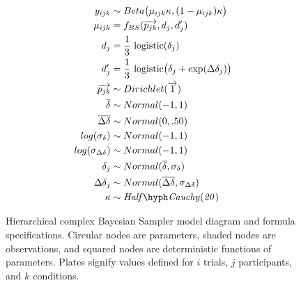 \begin{figure}
\begin{minipage}{.5\textwidth}
\begin{tikzpicture}
\end{tikzpicture}
  \end{minipage}%
  \begin{minipage}{.5\textwidth}
    \flushleft
    \small
    \begin{align*}
  y_{ijk} &\sim Beta\big(\mu_{ijk} \kappa, (1-\mu_{ijk}) \kappa \big) \\
  \mu_{ijk} &= f_{BS}(\overrightarrow{p_{jk}}, d_j, d_j')  \\
  d_j &= \frac{1}{3} \ \text{logistic}(\delta_j) \\
  d_j' &= \frac{1}{3} \ \text{logistic}\big(\delta_j + \exp(\Delta\delta_j)\big) \\
  \overrightarrow{p_{jk}} &\sim Dirichlet(\overrightarrow{1}) \\
  \overline{\delta} &\sim Normal(-1, 1) \\
  \overline{\Delta\delta} &\sim Normal(0, .50) \\
  log(\sigma_{\delta}) &\sim Normal(-1, 1) \\
  log(\sigma_{\Delta\delta}) &\sim Normal(-1, 1) \\
  \delta_j &\sim Normal(\overline{\delta}, \sigma_{\delta}) \\
  \Delta\delta_j &\sim Normal(\overline{\Delta\delta}, \sigma_{\Delta\delta}) \\
  \kappa &\sim \mathit{Half \hyph Cauchy(20)} \\
\end{align*}

  \end{minipage}
  \caption{Hierarchical complex Bayesian Sampler model diagram and formula specifications. Circular nodes are parameters, shaded nodes are observations, and squared nodes are deterministic functions of parameters. Plates signify values defined for $i$ trials, $j$ participants, and $k$ conditions.}
\end{figure}

